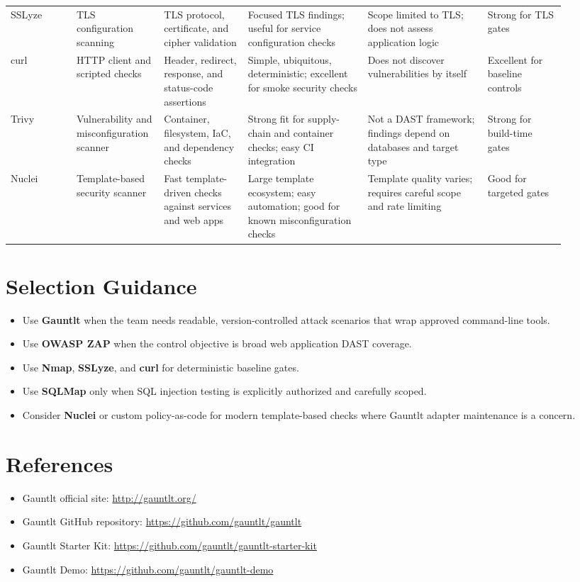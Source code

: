 \documentclass[10pt]{article}
\begin{document}
\begin{longtable}{@{}L{0.11\linewidth}L{0.13\linewidth}L{0.14\linewidth}L{0.20\linewidth}L{0.20\linewidth}L{0.13\linewidth}@{}}
SSLyze & TLS configuration scanning & TLS protocol, certificate, and cipher validation & Focused TLS findings; useful for service configuration checks & Scope limited to TLS; does not assess application logic & Strong for TLS gates \\
\addlinespace
curl & HTTP client and scripted checks & Header, redirect, response, and status-code assertions & Simple, ubiquitous, deterministic; excellent for smoke security checks & Does not discover vulnerabilities by itself & Excellent for baseline controls \\
\addlinespace
Trivy & Vulnerability and misconfiguration scanner & Container, filesystem, IaC, and dependency checks & Strong fit for supply-chain and container checks; easy CI integration & Not a DAST framework; findings depend on databases and target type & Strong for build-time gates \\
\addlinespace
Nuclei & Template-based security scanner & Fast template-driven checks against services and web apps & Large template ecosystem; easy automation; good for known misconfiguration checks & Template quality varies; requires careful scope and rate limiting & Good for targeted gates \\
\bottomrule
\end{longtable}

\normalsize
\section*{Selection Guidance}
\begin{itemize}
  \item Use \textbf{Gauntlt} when the team needs readable, version-controlled attack scenarios that wrap approved command-line tools.
  \item Use \textbf{OWASP ZAP} when the control objective is broad web application DAST coverage.
  \item Use \textbf{Nmap}, \textbf{SSLyze}, and \textbf{curl} for deterministic baseline gates.
  \item Use \textbf{SQLMap} only when SQL injection testing is explicitly authorized and carefully scoped.
  \item Consider \textbf{Nuclei} or custom policy-as-code for modern template-based checks where Gauntlt adapter maintenance is a concern.
\end{itemize}

\section*{References}
\begin{itemize}
  \item Gauntlt official site: \url{http://gauntlt.org/}
  \item Gauntlt GitHub repository: \url{https://github.com/gauntlt/gauntlt}
  \item Gauntlt Starter Kit: \url{https://github.com/gauntlt/gauntlt-starter-kit}
  \item Gauntlt Demo: \url{https://github.com/gauntlt/gauntlt-demo}
\end{itemize}
\end{document}
